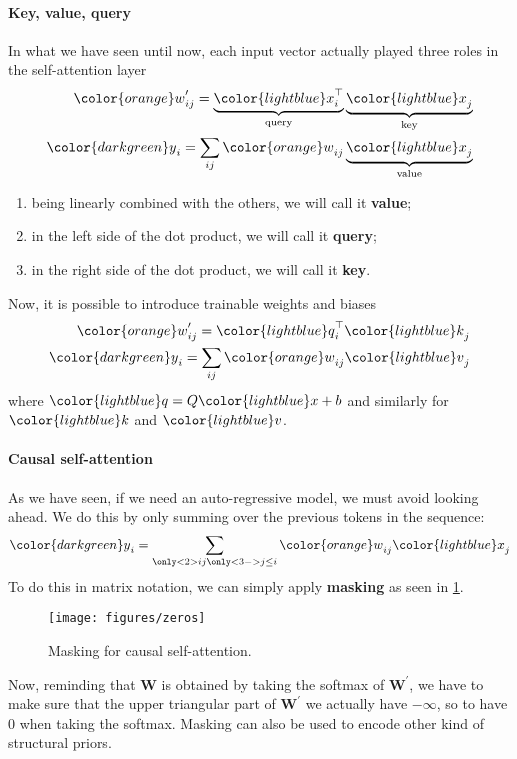 \paragraph{Key, value, query}
In what we have seen until now, each input vector actually played three roles in the self-attention layer
\begin{align*}
    {\color{orange}w}_{ij}' = \underbrace{{\color{lightblue}x}_i^\top}_{\mathrm{query}} \underbrace{{\color{lightblue}x}_j}_{\mathrm{key}} \\
    {\color{darkgreen}y}_i = \sum_{ij} {\color{orange}w}_{ij} \underbrace{{\color{lightblue}x}_j}_{\mathrm{value}}
\end{align*}
\begin{enumerate}
    \item being linearly combined with the others, we will call it \textbf{value};
    \item in the left side of the dot product, we will call it \textbf{query};
    \item in the right side of the dot product, we will call it \textbf{key}.
\end{enumerate} 
Now, it is possible to introduce trainable weights and biases
\begin{align*}
    {\color{orange}w}_{ij}' = {\color{lightblue}q}_i^\top {\color{lightblue}k}_j \\
    {\color{darkgreen}y}_i = \sum_{ij} {\color{orange}w}_{ij} {\color{lightblue}v}_j
\end{align*}
where ${\color{lightblue}q} = Q{\color{lightblue}x} + b$ and similarly for ${\color{lightblue}k}$ and ${\color{lightblue}v}$.

\paragraph{Causal self-attention}
As we have seen, if we need an auto-regressive model, we must avoid looking ahead.
We do this by only summing over the previous tokens in the sequence: 
\[
    {\color{darkgreen}y}_i = \sum_{\only<2>{ij}\only<3->{j\le i}} {\color{orange}w}_{ij} {\color{lightblue}x}_j
\]
To do this in matrix notation, we can simply apply \textbf{masking} as seen in \cref{fig:causal-self-attention-mask}.
\begin{figure}[H]
    \centering
    \texttt{[image: figures/zeros]}
    \caption{Masking for causal self-attention.}\label{fig:causal-self-attention-mask}
\end{figure}
Now, reminding that $\mathbf{W}$ is obtained by taking the softmax of $\mathbf{W}^\prime$, we have to make sure that the upper triangular part of $\mathbf{W}^\prime$ we actually have $-\infty$, so to have $0$ when taking the softmax.
Masking can also be used to encode other kind of structural priors.
